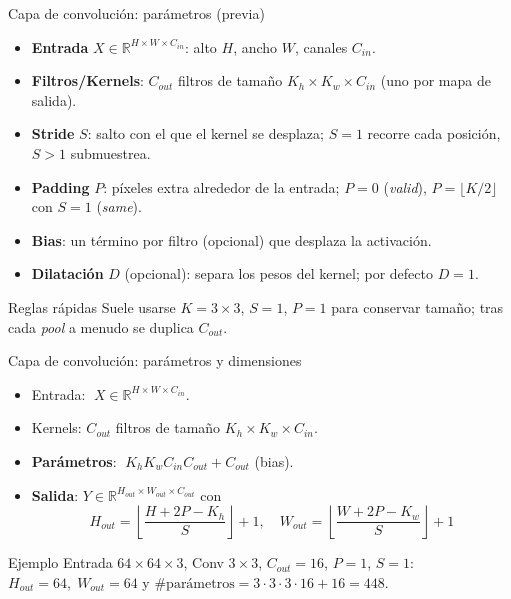 \documentclass[10pt]{beamer}
\begin{document}
\begin{frame}{Capa de convoluci\'on: par\'ametros (previa)}
\begin{itemize}
  \item \textbf{Entrada} $X\in\mathbb{R}^{H\times W\times C_{in}}$: alto $H$, ancho $W$, canales $C_{in}$.
  \item \textbf{Filtros/Kernels}: $C_{out}$ filtros de tama\~no $K_h\times K_w\times C_{in}$ (uno por mapa de salida).
  \item \textbf{Stride} $S$: salto con el que el kernel se desplaza; $S{=}1$ recorre cada posici\'on, $S{>}1$ submuestrea.
  \item \textbf{Padding} $P$: p\'ixeles extra alrededor de la entrada; $P{=}0$ (\emph{valid}), $P{=}\lfloor K/2\rfloor$ con $S{=}1$ (\emph{same}).
  \item \textbf{Bias}: un t\'ermino por filtro (opcional) que desplaza la activaci\'on.
  \item \textbf{Dilataci\'on} $D$ (opcional): separa los pesos del kernel; por defecto $D{=}1$.
\end{itemize}
\vspace{1mm}
\begin{block}{Reglas r\'apidas}
Suele usarse $K{=}3\times3$, $S{=}1$, $P{=}1$ para conservar tama\~no; tras cada \emph{pool} a menudo se duplica $C_{out}$.
\end{block}
\end{frame}


\begin{frame}{Capa de convoluci\'on: par\'ametros y dimensiones}
\begin{itemize}
  \item Entrada: $\;X\in\mathbb{R}^{H\times W\times C_{in}}$.
  \item Kernels: $C_{out}$ filtros de tama\~no $K_h\times K_w\times C_{in}$.
  \item \textbf{Par\'ametros}: $\;K_h K_w C_{in} C_{out} + C_{out}$ (bias).
  \item \textbf{Salida}: $Y\in\mathbb{R}^{H_{out}\times W_{out}\times C_{out}}$ con
  \[
    H_{out} = \left\lfloor \frac{H + 2P - K_h}{S} \right\rfloor + 1,\quad
    W_{out} = \left\lfloor \frac{W + 2P - K_w}{S} \right\rfloor + 1
  \]
\end{itemize}
\vspace{2mm}
\begin{block}{Ejemplo}
Entrada $64\times 64\times 3$, Conv $3\times3$, $C_{out}{=}16$, $P{=}1$, $S{=}1$:
$H_{out}{=}64,\;W_{out}{=}64$ y $\#\text{par\'ametros}=3\cdot3\cdot3\cdot16+16=448$.
\end{block}
\end{frame}
\end{document}
